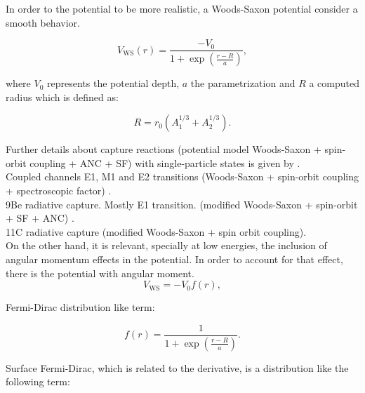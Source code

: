\documentclass[openany]{book}
\begin{document}
In order to the potential to be more realistic, a Woods-Saxon potential consider a smooth behavior.

\begin{equation} \label{eq:potential_WoodsSaxon}
	V_{\mathrm{WS}}(r) = \frac{-V_0}{1 + \exp  \left({\frac{r-R}{a}}\right)},
\end{equation}

where $V_0$ represents the potential depth, $a$ the parametrization and $R$ a computed radius which is defined as: 

\begin{equation} \label{eq:potential_WoodsSaxon_radius}
	R = r_0(A_1^{1/3} + A_2^{1/3}).
\end{equation}

Further details about capture reactions (potential model Woods-Saxon + spin-orbit coupling + ANC + SF) with single-particle states is given by \cite{huang_bertulani_guimaraes_2010}. \\

Coupled channels  E1, M1 and E2 transitions (Woods-Saxon + spin-orbit coupling + spectroscopic factor) \cite{bertulani_1996}. \\

9Be radiative capture. Mostly E1 transition.  (modified Woods-Saxon + spin-orbit + SF + ANC) \cite{kabir_nabi_2021}. \\

11C radiative capture (modified Woods-Saxon + spin orbit coupling)\cite{kabir_irgaziev_nabi_sagheer_2022}. \\

On the other hand, it is relevant, specially at low energies, the inclusion of angular momentum effects in the potential. In order to account for that effect, there is the potential with angular moment. \\

\begin{equation} \label{eq:potential_WoodsSaxon2}
	V_{\mathrm{WS}} = -V_0 f(r),
\end{equation}

Fermi-Dirac distribution like term: 

\begin{equation}  \label{eq:potential_WoodsSaxon2_fermiDirac}
	f(r) = \frac{1}{1 + \exp {\left(\frac{r- R}{a}\right)}}.
\end{equation}

Surface Fermi-Dirac, which is related to the derivative, is a distribution like the following term: 
\end{document}
